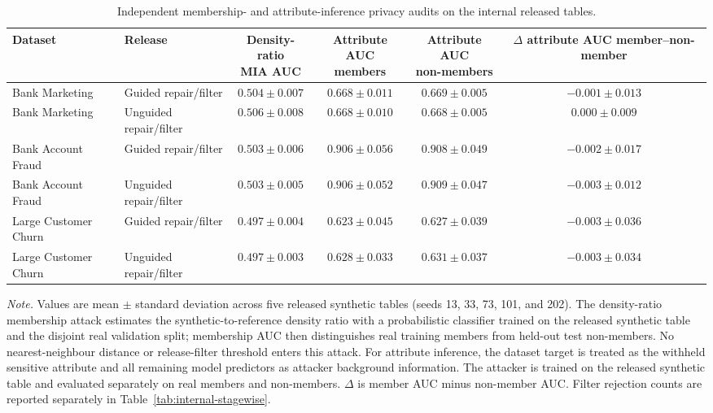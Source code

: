 \begin{table}[t]
\centering
\caption{Independent membership- and attribute-inference privacy audits on the internal released tables.}
\label{tab:independent-privacy-attacks}
\scriptsize
\setlength{\tabcolsep}{3.3pt}
\renewcommand{\arraystretch}{1.10}
\begin{adjustbox}{max width=\textwidth}
\begin{tabular}{llcccc}
\toprule
\textbf{Dataset} & \textbf{Release} & \makecell{\textbf{Density-ratio}\\\textbf{MIA AUC}} & \makecell{\textbf{Attribute AUC}\\\textbf{members}} & \makecell{\textbf{Attribute AUC}\\\textbf{non-members}} & \makecell{\textbf{$\Delta$ attribute AUC}\\\textbf{member--non-member}} \\
\midrule
Bank Marketing & Guided repair/filter & $0.504\pm0.007$ & $0.668\pm0.011$ & $0.669\pm0.005$ & $-0.001\pm0.013$ \\
Bank Marketing & Unguided repair/filter & $0.506\pm0.008$ & $0.668\pm0.010$ & $0.668\pm0.005$ & $0.000\pm0.009$ \\
Bank Account Fraud & Guided repair/filter & $0.503\pm0.006$ & $0.906\pm0.056$ & $0.908\pm0.049$ & $-0.002\pm0.017$ \\
Bank Account Fraud & Unguided repair/filter & $0.503\pm0.005$ & $0.906\pm0.052$ & $0.909\pm0.047$ & $-0.003\pm0.012$ \\
Large Customer Churn & Guided repair/filter & $0.497\pm0.004$ & $0.623\pm0.045$ & $0.627\pm0.039$ & $-0.003\pm0.036$ \\
Large Customer Churn & Unguided repair/filter & $0.497\pm0.003$ & $0.628\pm0.033$ & $0.631\pm0.037$ & $-0.003\pm0.034$ \\
\bottomrule
\end{tabular}
\end{adjustbox}
\vspace{0.3em}
\begin{minipage}{0.99\textwidth}
\scriptsize
\textit{Note.} Values are mean $\pm$ standard deviation across five released synthetic tables (seeds 13, 33, 73, 101, and 202). The density-ratio membership attack estimates the synthetic-to-reference density ratio with a probabilistic classifier trained on the released synthetic table and the disjoint real validation split; membership AUC then distinguishes real training members from held-out test non-members. No nearest-neighbour distance or release-filter threshold enters this attack. For attribute inference, the dataset target is treated as the withheld sensitive attribute and all remaining model predictors as attacker background information. The attacker is trained on the released synthetic table and evaluated separately on real members and non-members. $\Delta$ is member AUC minus non-member AUC. Filter rejection counts are reported separately in Table~\ref{tab:internal-stagewise}.
\end{minipage}
\end{table}